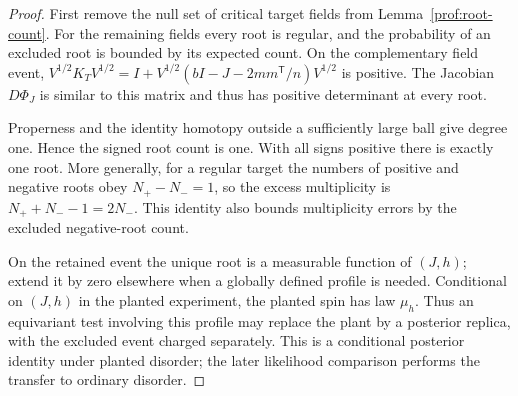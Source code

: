 \begin{proof}
First remove the null set of critical target fields from
Lemma~\ref{prof:root-count}. For the remaining fields every root is
regular, and the probability of an excluded root is bounded by its
expected count. On the complementary field event,
$V^{1/2}K_TV^{1/2}
=I+V^{1/2}(bI-J-2mm^{\mathsf T}/n)V^{1/2}$ is positive.
The Jacobian $D\Phi_J$ is similar to this matrix and thus has positive
determinant at every root.

Properness and the identity homotopy outside a sufficiently large ball
give degree one. Hence the signed root count is one. With all signs
positive there is exactly one root. More generally, for a regular
target the numbers of positive and negative roots obey
$N_+-N_-=1$, so the excess multiplicity is
$N_++N_--1=2N_-$. This identity also bounds multiplicity errors by
the excluded negative-root count.

On the retained event the unique root is a measurable function of
$(J,h)$; extend it by zero elsewhere when a globally defined profile
is needed. Conditional on $(J,h)$ in the planted experiment, the
planted spin has law $\mu_h$. Thus an equivariant test involving this
profile may replace the plant by a posterior replica, with the
excluded event charged separately. This is a conditional posterior
identity under planted disorder; the later likelihood comparison
performs the transfer to ordinary disorder.
\end{proof}
